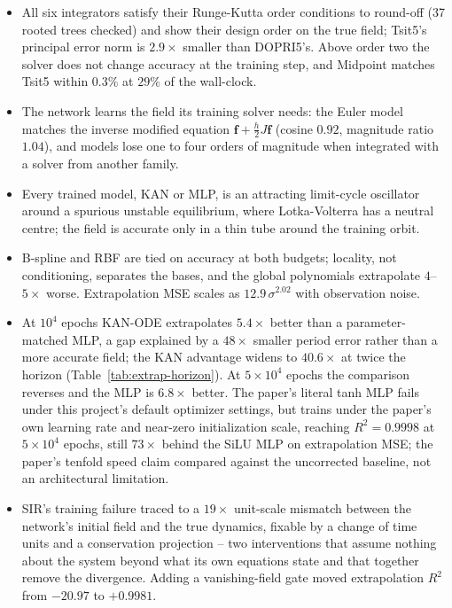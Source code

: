 \begin{itemize}
\item All six integrators satisfy their Runge-Kutta order conditions to
  round-off (37 rooted trees checked) and show their design order on the
  true field; Tsit5's principal error norm is $2.9\times$ smaller than
  DOPRI5's. Above order two the solver does not change accuracy at the
  training step, and Midpoint matches Tsit5 within $0.3\%$ at $29\%$ of the
  wall-clock.
\item The network learns the field its training solver needs: the Euler model
  matches the inverse modified equation $\mathbf{f}+\tfrac{h}{2}J\mathbf{f}$
  (cosine $0.92$, magnitude ratio $1.04$), and models lose one to four orders
  of magnitude when integrated with a solver from another family.
\item Every trained model, KAN or MLP, is an attracting limit-cycle
  oscillator around a spurious unstable equilibrium, where Lotka-Volterra has
  a neutral centre; the field is accurate only in a thin tube around the
  training orbit.
\item B-spline and RBF are tied on accuracy at both budgets; locality, not
  conditioning, separates the bases, and the global polynomials extrapolate
  $4$--$5\times$ worse. Extrapolation MSE scales as $12.9\,\sigma^{2.02}$
  with observation noise.
\item At $10^4$ epochs KAN-ODE extrapolates $5.4\times$ better than a
  parameter-matched MLP, a gap explained by a $48\times$ smaller period
  error rather than a more accurate field; the KAN advantage widens to
  $40.6\times$ at twice the horizon (Table~\ref{tab:extrap-horizon}). At
  $5\times10^4$ epochs the comparison reverses and the MLP is $6.8\times$
  better. The paper's literal tanh MLP fails under this project's default
  optimizer settings, but trains under the paper's own learning rate and
  near-zero initialization scale, reaching $R^2=0.9998$ at $5\times10^4$
  epochs, still $73\times$ behind the SiLU MLP on extrapolation MSE; the
  paper's tenfold speed claim compared against the uncorrected baseline, not
  an architectural limitation.
\item SIR's training failure traced to a $19\times$ unit-scale mismatch
  between the network's initial field and the true dynamics, fixable by a
  change of time units and a conservation projection -- two interventions
  that assume nothing about the system beyond what its own equations state
  and that together remove the divergence. Adding a vanishing-field gate
  moved extrapolation $R^2$ from $-20.97$ to $+0.9981$.

\end{itemize}
